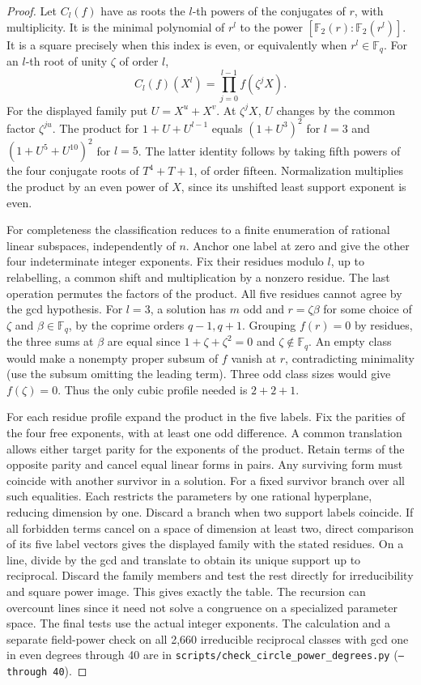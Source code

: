 \documentclass[11pt]{article}
\begin{document}
\begin{proof}
Let \(C_l(f)\) have as roots the \(l\)-th powers of the conjugates
of \(r\), with multiplicity. It is the minimal polynomial of
\(r^l\) to the power \([\mathbb F_2(r):\mathbb F_2(r^l)]\).
It is a square precisely when this index is even, or equivalently
when \(r^l\in\mathbb F_q\). For an \(l\)-th root of unity \(\zeta\)
of order \(l\),
\[
             C_l(f)(X^l)=\prod_{j=0}^{l-1} f(\zeta^j X).
\]
For the displayed family put \(U=X^u+X^v\). At \(\zeta^jX\),
\(U\) changes by the common factor \(\zeta^{ju}\).
The product for \(1+U+U^{l-1}\) equals \((1+U^3)^2\) for \(l=3\)
and \((1+U^5+U^{10})^2\) for \(l=5\). The latter identity follows
by taking fifth powers of the four conjugate roots of \(T^4+T+1\),
of order fifteen. Normalization multiplies the product by an even
power of \(X\), since its unshifted least support exponent is even.

For completeness the classification reduces to a finite enumeration
of rational linear subspaces, independently of \(n\). Anchor one
label at zero and give the other four indeterminate integer
exponents. Fix their residues modulo \(l\), up to relabelling, a
common shift and multiplication by a nonzero residue. The last
operation permutes the factors of the product. All five residues
cannot agree by the gcd hypothesis. For \(l=3\), a solution has
\(m\) odd and \(r=\zeta\beta\) for some choice of \(\zeta\) and
\(\beta\in\mathbb F_q\), by the coprime orders \(q-1,q+1\).
Grouping \(f(r)=0\) by residues, the three sums at \(\beta\)
are equal since \(1+\zeta+\zeta^2=0\) and \(\zeta\notin\mathbb F_q\).
An empty class would make a nonempty proper subsum of \(f\) vanish
at \(r\), contradicting minimality (use the subsum omitting the
leading term). Three odd class sizes would give \(f(\zeta)=0\).
Thus the only cubic profile needed is \(2+2+1\).

For each residue profile expand the product in the five labels.
Fix the parities of the four free exponents, with at least one
odd difference. A common translation allows either target parity
for the exponents of the product. Retain terms of the opposite
parity and cancel equal linear forms in pairs. Any surviving form
must coincide with another survivor in a solution. For a fixed
survivor branch over all such equalities. Each restricts the
parameters by one rational hyperplane, reducing dimension by one.
Discard a branch when two support labels coincide. If all forbidden
terms cancel on a space of dimension at least two, direct comparison
of its five label vectors gives the displayed family with the
stated residues. On a line, divide by the gcd and translate to
obtain its unique support up to reciprocal. Discard the family
members and test the rest directly for irreducibility and square
power image. This gives exactly the table. The recursion can
overcount lines since it need not solve a congruence on a
specialized parameter space. The final tests use the actual integer
exponents. The calculation and a separate field-power check on
all 2,660 irreducible reciprocal classes with gcd one in even
degrees through 40 are in
\nolinkurl{scripts/check_circle_power_degrees.py} (\texttt{--through 40}).
\end{proof}
\end{document}
